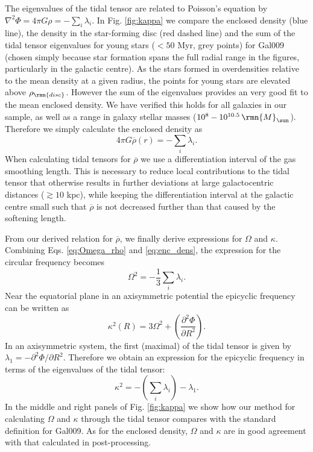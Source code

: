 \documentclass[fleqn,usenatbib]{mnras}
\newcommand\Msun{\,\rmn{M}_{\sun}}
\newcommand{\mean}[1]{\overline{#1}}
\newcommand{\pder}[3][]{\frac{\partial^{#1} #2}{\partial {#3}^{#1}}}
\begin{document}
The eigenvalues of the tidal tensor are related to Poisson's equation by $\nabla^2 \Phi = 4\pi G \rho = -\sum_i \lambda_i$.
In Fig. \ref{fig:kappa} we compare the enclosed density (blue line), the density in the star-forming disc (red dashed line) and the sum of the tidal tensor eigenvalues for young stars ($<50$ Myr, grey points) for Gal009 (chosen simply because star formation spans the full radial range in the figures, particularly in the galactic centre). As the stars formed in overdensities relative to the mean density at a given radius, the points for young stars are elevated above $\rho_\rmn{disc}$. However the sum of the eigenvalues provides an very good fit to the mean enclosed density. We have verified this holds for all galaxies in our sample, as well as a range in galaxy stellar masses ($10^8-10^{10.5} \Msun$).
Therefore we simply calculate the enclosed density as
\begin{equation} \label{eq:enc_dens}
4 \pi G \mean{\rho}(r) = - \sum_{i} \lambda_i .
\end{equation}
When calculating tidal tensors for $\mean{\rho}$ we use a differentiation interval of the gas smoothing length. This is necessary to reduce local contributions to the tidal tensor that otherwise results in further deviations at large galactocentric distances ($\gtrsim 10$ kpc), while keeping the differentiation interval at the galactic centre small such that $\mean{\rho}$ is not decreased further than that caused by the softening length.

From our derived relation for $\mean{\rho}$, we finally derive expressions for $\Omega$ and $\kappa$.
Combining Eqs. \ref{eq:Omega_rho} and \ref{eq:enc_dens}, the expression for the circular frequency becomes
\begin{equation} \label{eq:Omega}
\Omega^2 = - \frac{1}{3} \sum_{i} \lambda_i .
\end{equation}
Near the equatorial plane in an axisymmetric potential the epicyclic frequency can be written as \citep{Binney_and_Tremaine_08}
\begin{equation}
\kappa^2 (R) = 3 \Omega^2 + \left( \pder[2]{\Phi}{R} \right) .
\end{equation}
In an axisymmetric system, the first (maximal) of the tidal tensor is given by $\lambda_1 = - \partial^2 \Phi/\partial R^2 $.
Therefore we obtain an expression for the epicyclic frequency in terms of the eigenvalues of the tidal tensor:
\begin{equation} \label{eq:kappa}
\kappa^2 = -\left( \sum_{i} \lambda_i \right) - \lambda_1.
\end{equation}
In the middle and right panels of Fig. \ref{fig:kappa} we show how our method for calculating $\Omega$ and $\kappa$ through the tidal tensor compares with the standard definition for Gal009.
As for the enclosed density, $\Omega$ and $\kappa$ are in good agreement with that calculated in post-processing.
\end{document}
